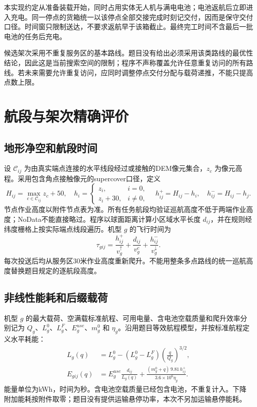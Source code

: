 \documentclass[a4paper,11pt]{article}
\begin{document}
本实现约定从准备装载开始，同时占用实体无人机与满电电池；电池返航后立即进入充电。同一停点的货箱统一以该停点全部交接完成时刻记交付，因而是保守交付口径。时间窗只限制送达，不要求返航早于该箱截止。最终完工时间不含最后一批电池的任务后充电。

候选架次采用不重复服务区的基本路线。题目没有给出必须采用该类路线的最优性结论，因此这是当前搜索空间的限制；程序不声称覆盖允许任意重复访问的所有路线。若未来需要允许重复访问，应同时调整停点交付分配与载荷递推，不能只提高点数上限。

\section{航段与架次精确评价}
\subsection{地形净空和航段时间}
设 $\mathcal C_{ij}$ 为由真实端点连接的水平线段经过或接触的DEM像元集合，$z_c$ 为像元高程。采用包含角点接触像元的supercover口径，定义
\begin{equation}
 H_{ij}=\max_{c\in\mathcal C_{ij}}z_c+50,\quad
 h_i=\begin{cases}z_i,&i=0,\\z_i+30,&i\ne0,\end{cases}\quad
 h_{ij}^{+}=H_{ij}-h_i,\quad h_{ij}^{-}=H_{ij}-h_j.
\end{equation}
节点作业高度以附件节点表为准。所有任务航段均验证巡航高度不低于两端作业高度；NoData不能直接略过。程序以球面距离计算小区域水平长度 $d_{ij}$，并在规则经纬度栅格上按实际端点线段遍历。机型 $g$ 的飞行时间为
\begin{equation}
 \tau_{gij}=\frac{h_{ij}^{+}}{v_g^\uparrow}+\frac{d_{ij}}{v_g^c}+\frac{h_{ij}^{-}}{v_g^\downarrow}.
\end{equation}
每次投送后均从服务区30米作业高度重新爬升。不能用整条多点路线的统一巡航高度替换题目规定的逐航段高度。

\subsection{非线性能耗和后缀载荷}
机型 $g$ 的最大载荷、空满载标准航程、可用电量、含电池空载质量和爬升效率分别记为 $Q_g$、$L_g^0$、$L_g^F$、$E_g^{use}$、$m_g^0$ 和 $\eta_g$。沿用题目等效航程模型，并按标准航程定义水平耗能：
\begin{align}
 L_g(q)&=L_g^0-(L_g^0-L_g^F)\left(\frac q{Q_g}\right)^{3/2},\\
 E_{gij}(q)&=E_g^{use}\frac{d_{ij}}{L_g(q)}
       +\frac{(m_g^0+q)\,9.81\,h_{ij}^{+}}{3.6\times10^6\eta_g}.
\end{align}
能量单位为kWh，时间为秒。含电池空载质量已经包含电池，不重复计入。下降附加能耗按附件取零；题目没有提供运输悬停功率，本次不另加运输悬停能耗。
\end{document}
